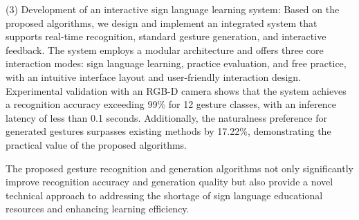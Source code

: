 \begin{abstract*}
(3) Development of an interactive sign language learning system: Based on the proposed algorithms, we design and implement an integrated system that supports real-time recognition, standard gesture generation, and interactive feedback. The system employs a modular architecture and offers three core interaction modes: sign language learning, practice evaluation, and free practice, with an intuitive interface layout and user-friendly interaction design. Experimental validation with an RGB-D camera shows that the system achieves a recognition accuracy exceeding 99\% for 12 gesture classes, with an inference latency of less than 0.1 seconds. Additionally, the naturalness preference for generated gestures surpasses existing methods by 17.22\%, demonstrating the practical value of the proposed algorithms.

The proposed gesture recognition and generation algorithms not only significantly improve recognition accuracy and generation quality but also provide a novel technical approach to addressing the shortage of sign language educational resources and enhancing learning efficiency.

\end{abstract*}
